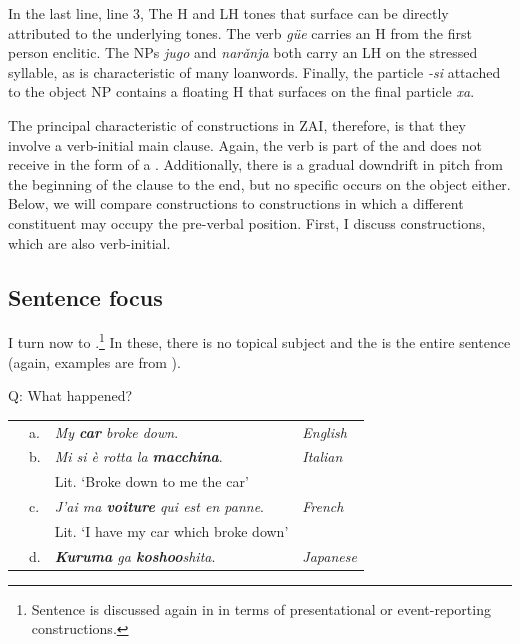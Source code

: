 In the last line, line 3, The H and LH tones that surface can be directly attributed to the underlying tones. The verb \textit{g\"{u}e} carries an H  from the first person enclitic. The NPs \textit{jugo} and  \textit{nar\v{a}nja} both carry an LH  on the stressed syllable, as is characteristic of many  loanwords. Finally, the particle \textit{-si} attached to the object NP contains a floating H  that surfaces on the final particle \textit{xa}. 

The principal characteristic of  constructions in ZAI, therefore, is that they involve a verb-initial main clause. Again, the verb is part of the  and does not receive  in the form of a . Additionally, there is a gradual downdrift in pitch from the beginning of the clause to the end, but no specific  occurs on the object either. Below, we will compare  constructions to  constructions in which a different constituent may occupy the pre-verbal position. First, I discuss  constructions, which are also verb-initial.



\subsection{Sentence focus}\label{sfsection}

I turn now to .\footnote{Sentence  is discussed again in  in terms of presentational or event-reporting constructions.} In these, there is no topical subject and the  is the entire sentence (again, examples are from \citet{lambrecht1994}). 


\ea\label{SF}
{Q: What happened?} \\
\begin{table} 
\begin{tabular}{l l l l}
 & a. & \textit{My \textbf{car} broke down}. & \textit{English} \\
 & b. & \textit{Mi si \`{e} rotta la \textbf{macchina}}. & \textit{Italian}  \\
  & & Lit. `Broke down to me the car'  \\
 & c. & \textit{J'ai ma \textbf{voiture} qui est en panne}. & \textit{French}  \\
  & & Lit. `I have my car which broke down' \\
   & d. & \textit{\textbf{Kuruma} ga \textbf{koshoo}shita}. & \textit{Japanese}  \\
\end{tabular}
\end{table}
\z

